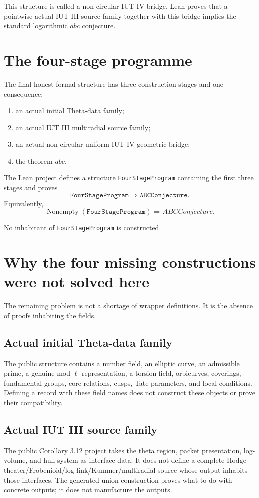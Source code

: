 \documentclass[11pt]{amsart}
\theoremstyle{definition}
\theoremstyle{remark}
\begin{document}
This structure is called a non-circular IUT IV bridge.  Lean proves that a
pointwise actual IUT III source family together with this bridge implies the
standard logarithmic $abc$ conjecture.

\section{The four-stage programme}

The final honest formal structure has three construction stages and one
consequence:

\begin{enumerate}[label=(\arabic*)]
\item an actual initial Theta-data family;
\item an actual IUT III multiradial source family;
\item an actual non-circular uniform IUT IV geometric bridge;
\item the theorem $abc$.
\end{enumerate}

The Lean project defines a structure \texttt{FourStageProgram} containing the
first three stages and proves
\[
 \boxed{
 \texttt{FourStageProgram}
 \Longrightarrow
 \texttt{ABCConjecture}.
 }
\]
Equivalently,
\[
 \operatorname{Nonempty}(\texttt{FourStageProgram})
 \Longrightarrow
 ABCConjecture.
\]

No inhabitant of \texttt{FourStageProgram} is constructed.

\section{Why the four missing constructions were not solved here}

The remaining problem is not a shortage of wrapper definitions.  It is the
absence of proofs inhabiting the fields.

\subsection{Actual initial Theta-data family}
The public structure contains a number field, an elliptic curve, an admissible
prime, a genuine mod-$\ell$ representation, a torsion field, orbicurves,
coverings, fundamental groups, core relations, cusps, Tate parameters, and
local conditions.  Defining a record with these field names does not construct
these objects or prove their compatibility.

\subsection{Actual IUT III source family}
The public Corollary 3.12 project takes the theta region, packet presentation,
log-volume, and hull system as interface data.  It does not define a complete
Hodge-theater/Frobenioid/log-link/Kummer/multiradial source whose output
inhabits those interfaces.  The generated-union construction proves what to
do with concrete outputs; it does not manufacture the outputs.
\end{document}
